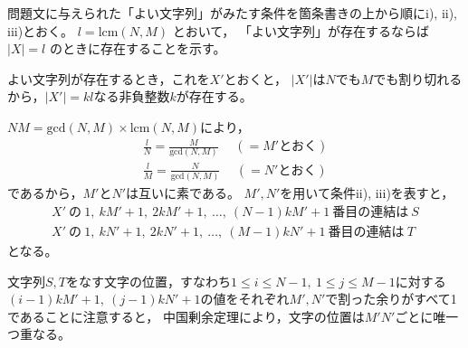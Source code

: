 \documentclass{article}
\begin{document}
問題文に与えられた「よい文字列」がみたす条件を箇条書きの上から順にi), ii), iii)とおく。
$l = \mathrm{lcm}(N, M)$ とおいて，
「よい文字列」が存在するならば $|X| = l$ のときに存在することを示す。

よい文字列が存在するとき，これを$X'$とおくと，
$|X'|$は$N$でも$M$でも割り切れるから，$|X'| = kl$なる非負整数$k$が存在する。

$NM = \mathrm{gcd}(N, M) \times \mathrm{lcm}(N, M)$により，
\begin{eqnarray*}
    \frac{l}{N} = \frac{M}{\mathrm{gcd}(N, M)} \hspace{15pt} (= M' \mbox{とおく}) \\
    \frac{l}{M} = \frac{N}{\mathrm{gcd}(N, M)} \hspace{15pt} (= N' \mbox{とおく})
\end{eqnarray*}
であるから，$M'$と$N'$は互いに素である。
$M', N'$を用いて条件ii), iii)を表すと，
\begin{eqnarray*}
    X'\ \mbox{の}\ 1,\ kM'+1,\ 2kM'+1,\ \ldots ,\ (N-1)kM'+1\ \mbox{番目の連結は}\ S \\
    X'\ \mbox{の}\ 1,\ kN'+1,\ 2kN'+1,\ \ldots ,\ (M-1)kN'+1\ \mbox{番目の連結は}\ T
\end{eqnarray*}
となる。

文字列$S, T$をなす文字の位置，すなわち$1 \leq i \leq N - 1,\ 1 \leq j \leq M - 1$に対する
$(i - 1)kM' + 1,\ (j - 1)kN' + 1$の値をそれぞれ$M', N'$で割った余りがすべて1であることに注意すると，
中国剰余定理により，文字の位置は$M'N'$ごとに唯一つ重なる。



\end{document}
